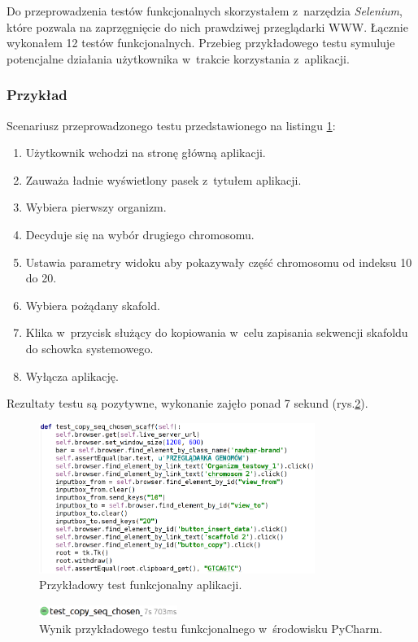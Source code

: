 \documentclass[a4paper,12pt,oneside]{mwrep}  %
\begin{document}
Do przeprowadzenia testów funkcjonalnych skorzystałem z~narzędzia \emph{Selenium}, które pozwala na zaprzęgnięcie do nich prawdziwej przeglądarki WWW. Łącznie wykonałem 12 testów funkcjonalnych. Przebieg przykładowego testu symuluje potencjalne działania użytkownika w~trakcie korzystania z~aplikacji.

\subsubsection{Przykład}
Scenariusz przeprowadzonego testu przedstawionego na listingu \ref{test_funkcjonalny}:
\begin{enumerate}
\item Użytkownik wchodzi na stronę główną aplikacji.
\item Zauważa ładnie wyświetlony pasek z~tytułem aplikacji.
\item Wybiera pierwszy organizm.
\item Decyduje się na wybór drugiego chromosomu.
\item Ustawia parametry widoku aby pokazywały część chromosomu od indeksu 10 do 20.
\item Wybiera pożądany skafold.
\item Klika w~przycisk służący do kopiowania w~celu zapisania sekwencji skafoldu do schowka systemowego.
\item Wyłącza aplikację.
\end{enumerate}

Rezultaty testu są pozytywne, wykonanie zajęło ponad 7 sekund (rys.\ref{wynik_testu_funkcjonalnego}).

\begin{figure}[!h]
\centering
\renewcommand{\figurename}{Listing.}
\includegraphics[width=0.8\textwidth]{grafika/test_funkcjonalny.png}
\caption{Przykładowy test funkcjonalny aplikacji.}
\label{test_funkcjonalny}
\end{figure}

\begin{figure}[!h]
\centering
\includegraphics[width=0.4\textwidth]{grafika/test_funk_wynik_pycharm.png}
\caption{Wynik przykładowego testu funkcjonalnego w~środowisku PyCharm.}
\label{wynik_testu_funkcjonalnego}
\end{figure}
\end{document}
